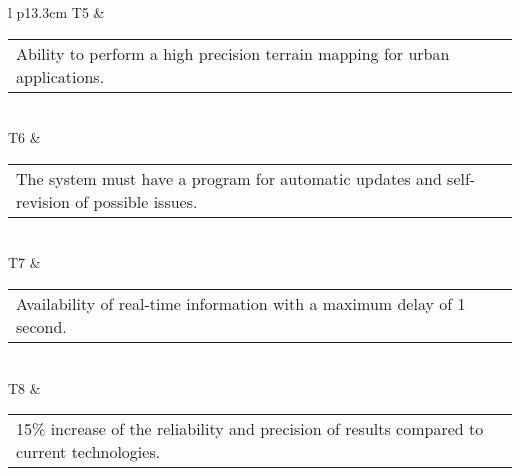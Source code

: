 \begin{longtable}[H]{l p{13.3cm}}
	T5 & \begin{tabular}[c]{@{}l@{}}\begin{minipage}[t]{\linewidth}
			Ability to perform a high precision terrain mapping for urban applications. \vspace{0.3cm}
	\end{minipage} \end{tabular}                                                                                                                                             \\  \midrule
	T6 & \begin{tabular}[c]{@{}l@{}}\begin{minipage}[t]{\linewidth}
			The system must have a program for automatic updates and self-revision of possible issues. \vspace{0.3cm}
	\end{minipage} \end{tabular}                                                                                                                                          \\  \midrule
	T7 & \begin{tabular}[c]{@{}l@{}}\begin{minipage}[t]{\linewidth}
			Availability of real-time information with a maximum delay of 1 second. \vspace{0.3cm}
	\end{minipage} \end{tabular}
	\\ \midrule
	T8 & \begin{tabular}[c]{@{}l@{}}\begin{minipage}[t]{\linewidth}
			15\% increase of the reliability and precision of results compared to current technologies. \vspace{0.3cm}
	\end{minipage} \end{tabular}                                                                                                                                             \\                                                                   	\bottomrule[2pt]
	\caption{Technical requirements}
\end{longtable}
